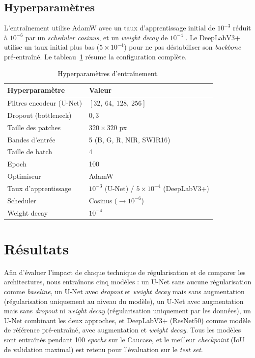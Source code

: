 \documentclass[11pt]{article}
\begin{document}
\subsection{Hyperparamètres}

L'entraînement utilise AdamW \citep{AdamW2017} avec un taux d'apprentissage initial de $10^{-3}$ réduit à $10^{-6}$ par un \emph{scheduler cosinus}, et un \emph{weight decay} de $10^{-4}$ \citep{decoupledWeight2019}. Le DeepLabV3+ utilise un taux initial plus bas ($5 \times 10^{-4}$) pour ne pas déstabiliser son \emph{backbone} pré-entraîné. Le tableau~\ref{tab:hyperparams} résume la configuration complète.

\begin{table}[h]
\caption{Hyperparamètres d'entraînement.}
\label{tab:hyperparams}
\begin{center}
\begin{tabular}{ll}
\toprule
Hyperparamètre & Valeur \\
\midrule
Filtres encodeur (U-Net)  & $[32,\ 64,\ 128,\ 256]$ \\
Dropout (bottleneck)      & $0{,}3$ \\
Taille des patches        & $320 \times 320$ px \\
Bandes d'entrée           & 5 (B, G, R, NIR, SWIR16) \\
Taille de batch           & 4 \\
Epoch                     & 100 \\
Optimiseur                & AdamW \\
Taux d'apprentissage      & $10^{-3}$ (U-Net) / $5 \times 10^{-4}$ (DeepLabV3+) \\
Scheduler                 & Cosinus ($\to 10^{-6}$) \\
Weight decay              & $10^{-4}$ \\
\bottomrule
\end{tabular}
\end{center}
\end{table}

 
 
\section{Résultats}
Afin d'évaluer l'impact de chaque technique de régularisation et
de comparer les architectures, nous entraînons cinq modèles :
un U-Net sans aucune régularisation comme \textit{baseline},
un U-Net avec \emph{dropout} et \emph{weight decay} mais sans augmentation
(régularisation uniquement au niveau du modèle), un U-Net avec
augmentation mais sans \emph{dropout} ni \emph{weight decay} (régularisation
uniquement par les données), un U-Net combinant les deux
approches, et DeepLabV3+ (ResNet50) comme modèle de référence
pré-entraîné, avec augmentation et \emph{weight decay}. Tous les modèles
sont entraînés pendant 100 \textit{epochs} sur le Caucase, et le
meilleur \textit{checkpoint} (IoU de validation maximal) est
retenu pour l'évaluation sur le \textit{test set}.
\end{document}
